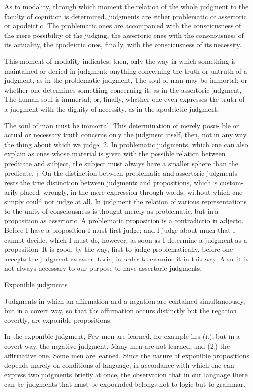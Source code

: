 As to modality, through which moment the relation of
the whole judgment to the faculty of cognition is determined,
judgments are either problematic or assertoric or apodeictic.
The problematic ones are accompanied with the consciousness of
the mere possibility of the judging,
the assertoric ones with the consciousness of its actuality,
the apodeictic ones, finally, with the consciousness of its necessity.

    This moment of modality indicates, then, only
    the way in which something is maintained or denied in judgment:
    anything concerning the truth or untruth of a judgment,
    as in the problematic judgment, The soul of man may be immortal;
    or whether one determines something concerning it,
    as in the assertoric judgment, The human soul is immortal;
    or, finally, whether one even expresses the truth of a judgment
    with the dignity of necessity, as in the apodeictic judgment,

The soul of man must be immortal. This determination of merely possi-
ble or actual or necessary truth concerns only the judgment itself, then, not
in any way the thing about which we judge.
2. In problematic judgments, which one can also explain as ones whose
material is given with the possible relation between predicate and subject,
the subject must always have a smaller sphere than the predicate.
j. On the distinction between problematic and assertoric judgments rests
the true distinction between judgments and propositions, which is custom-
arily placed, wrongly, in the mere expression through words, without
which one simply could not judge at all. In judgment the relation of
various representations to the unity of consciousness is thought merely as
problematic, but in a proposition as assertoric. A problematic proposition
is a contradictio in adjecto. Before I have a proposition I must first judge;
and I judge about much that I cannot decide, which I must do, however,
as soon as I determine a judgment as a proposition. It is good, by the way,
first to judge problematically, before one accepts the judgment as asser-
toric, in order to examine it in this way. Also, it is not always necessary to
our purpose to have assertoric judgments.

Exponible judgments

Judgments in which an affirmation and a negation are contained simultaneously,
but in a covert way, so that the affirmation occurs distinctly but
the negation covertly, are exponible propositions.

    In the exponible judgment, Few men are learned, for example lies (i.), but
    in a covert way, the negative judgment, Many men are not learned, and (2.)
    the affirmative one, Some men are learned. Since the nature of exponible
    propositions depends merely on conditions of language, in accordance
    with which one can express two judgments briefly at once, the observation
    that in our language there can be judgments that must be expounded
    belongs not to logic but to grammar.

